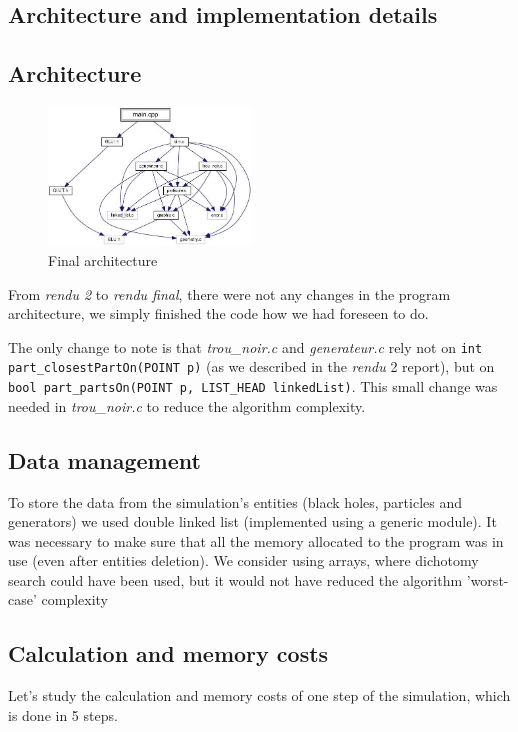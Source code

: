 \documentclass[a4paper]{article} %
\begin{document}
\begin{multicols*}{2}
\section{Architecture and implementation details}

\subsection{Architecture}
\begin{figure}[H]
\centering
\includegraphics[width=0.48\textwidth]{architecture.jpg}
\caption{Final architecture}
\end{figure}

From \emph{rendu 2} to \emph{rendu final}, there were not any changes in the
program architecture, we simply finished the code how we had foreseen to do.

The only change to note is that \emph{trou\_noir.c} and \emph{generateur.c} rely not on \texttt{int part\_closestPartOn(POINT p)}
(as we described in the \emph{rendu }2 report), but on \texttt{bool part\_partsOn(POINT p, LIST\_HEAD linkedList)}.
This small change was needed in \emph{trou\_noir.c} to reduce the algorithm complexity.

\subsection{Data management}
To store the data from the simulation's entities (black holes, particles and generators)
we used double linked list (implemented using a generic module).
It was necessary to make sure that all the memory allocated to the program was in use (even after entities deletion).
We consider using arrays, where dichotomy search could have been used, but it would not have reduced the algorithm 'worst-case' complexity 

\subsection{Calculation and memory costs}
Let's study the calculation and memory costs of one step of the simulation,
which is done in 5 steps.


\end{multicols*}
\end{document}
